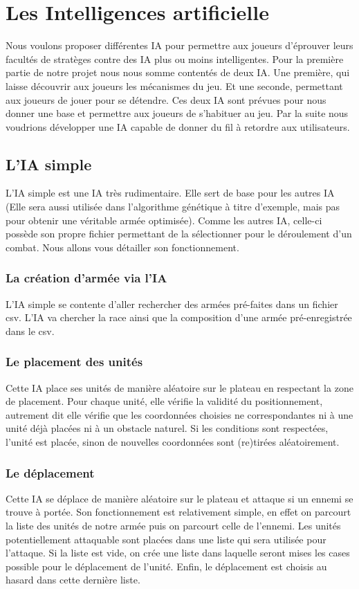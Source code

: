 \documentclass{article}
\begin{document}
\section{Les Intelligences artificielle}
 Nous voulons proposer différentes IA pour permettre aux joueurs d'éprouver leurs facultés de stratèges contre des IA plus ou moins intelligentes. Pour la première partie de notre projet nous nous somme contentés de deux IA. Une première, qui laisse découvrir aux joueurs les mécanismes du jeu. Et une seconde, permettant aux joueurs de jouer pour se détendre. Ces deux IA sont prévues pour nous donner une base et permettre aux joueurs de s'habituer au jeu. Par la suite nous voudrions développer une IA capable de donner du fil à retordre aux utilisateurs. 
 \subsection{L'IA simple}
  L'IA simple est une IA très rudimentaire. Elle sert de base pour les autres IA (Elle sera aussi utilisée dans l'algorithme génétique à titre d'exemple, mais pas pour obtenir une véritable armée optimisée). Comme les autres IA, celle-ci possède son propre fichier permettant de la sélectionner pour le déroulement d'un combat. Nous allons vous détailler son fonctionnement.
  
  \subsubsection{La création d'armée via l'IA}
  L'IA simple se contente d'aller rechercher des armées pré-faites dans un fichier csv. L'IA va chercher la race ainsi que la composition d'une armée pré-enregistrée dans le csv.

  \subsubsection{Le placement des unités}
 Cette IA place ses unités de manière aléatoire sur le plateau en respectant la zone de placement. Pour chaque unité, elle vérifie la validité du positionnement, autrement dit elle vérifie que les coordonnées choisies ne correspondantes ni à une unité déjà placées ni à un obstacle naturel. Si les conditions sont respectées, l'unité est placée, sinon de nouvelles coordonnées sont (re)tirées aléatoirement. 
 
  \subsubsection{Le déplacement}
 Cette IA se déplace de manière aléatoire sur le plateau et attaque si un ennemi se trouve à portée. Son fonctionnement est relativement simple, en effet on parcourt la liste des unités de notre armée puis on parcourt celle de l'ennemi. Les unités potentiellement attaquable sont placées dans une liste qui sera utilisée pour l'attaque. Si la liste est vide, on crée une liste dans laquelle seront mises les cases possible pour le déplacement de l'unité. Enfin, le déplacement est choisis au hasard dans cette dernière liste.
 
\end{document}
